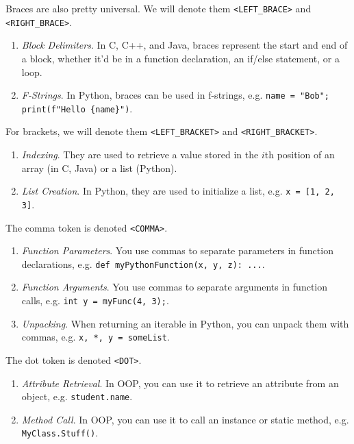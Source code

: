   \begin{example}[Braces]
    Braces are also pretty universal. We will denote them \texttt{<LEFT\_BRACE>} and \texttt{<RIGHT\_BRACE>}.
    \begin{enumerate}
      \item \textit{Block Delimiters}. In C, C++, and Java, braces represent the start and end of a block, whether it'd be in a function declaration, an if/else statement, or a loop. 
      \item \textit{F-Strings}. In Python, braces can be used in f-strings, e.g. \texttt{name = "Bob"; print(f"Hello \{name\}")}.
    \end{enumerate}
  \end{example} 

  \begin{example}[Brackets]
    For brackets, we will denote them \texttt{<LEFT\_BRACKET>} and \texttt{<RIGHT\_BRACKET>}.
    \begin{enumerate}
      \item \textit{Indexing}. They are used to retrieve a value stored in the $i$th position of an array (in C, Java) or a list (Python). 
      \item \textit{List Creation}. In Python, they are used to initialize a list, e.g. \texttt{x = [1, 2, 3]}.
    \end{enumerate}
  \end{example}

  \begin{example}[Comma]
    The comma token is denoted \texttt{<COMMA>}. 
    \begin{enumerate}
      \item \textit{Function Parameters}. You use commas to separate parameters in function declarations, e.g. \texttt{def myPythonFunction(x, y, z): ...}.
      \item \textit{Function Arguments}. You use commas to separate arguments in function calls, e.g. \texttt{int y = myFunc(4, 3);}.
      \item \textit{Unpacking}. When returning an iterable in Python, you can unpack them with commas, e.g. \texttt{x, *, y = someList}.
    \end{enumerate}
  \end{example}
  
  \begin{example}[Dot]
    The dot token is denoted \texttt{<DOT>}. 
    \begin{enumerate}
      \item \textit{Attribute Retrieval}. In OOP, you can use it to retrieve an attribute from an object, e.g. \texttt{student.name}.
      \item \textit{Method Call}. In OOP, you can use it to call an instance or static method, e.g. \texttt{MyClass.Stuff()}.
    \end{enumerate}
  \end{example}

